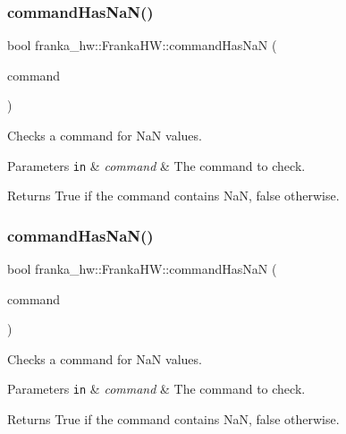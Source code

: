 \subsubsection{\texorpdfstring{command\+Has\+Na\+N()}{commandHasNaN()}\hspace{0.1cm}{\footnotesize\ttfamily [4/5]}}
{\footnotesize\ttfamily bool franka\+\_\+hw\+::\+Franka\+H\+W\+::command\+Has\+NaN (\begin{DoxyParamCaption}\item[{const franka\+::\+Cartesian\+Pose \&}]{command }\end{DoxyParamCaption})\hspace{0.3cm}{\ttfamily [static]}}

Checks a command for NaN values.


\begin{DoxyParams}[1]{Parameters}
\mbox{\tt in}  & {\em command} & The command to check.\\
\hline
\end{DoxyParams}
\begin{DoxyReturn}{Returns}
True if the command contains NaN, false otherwise. 
\end{DoxyReturn}
\mbox{\label{classfranka__hw_1_1_franka_h_w_ac408df87375bb8cfde94f4e5bf4a16c2}} 
\subsubsection{\texorpdfstring{command\+Has\+Na\+N()}{commandHasNaN()}\hspace{0.1cm}{\footnotesize\ttfamily [5/5]}}
{\footnotesize\ttfamily bool franka\+\_\+hw\+::\+Franka\+H\+W\+::command\+Has\+NaN (\begin{DoxyParamCaption}\item[{const franka\+::\+Cartesian\+Velocities \&}]{command }\end{DoxyParamCaption})\hspace{0.3cm}{\ttfamily [static]}}

Checks a command for NaN values.


\begin{DoxyParams}[1]{Parameters}
\mbox{\tt in}  & {\em command} & The command to check.\\
\hline
\end{DoxyParams}
\begin{DoxyReturn}{Returns}
True if the command contains NaN, false otherwise. 
\end{DoxyReturn}
\mbox{\label{classfranka__hw_1_1_franka_h_w_abbafdee04c749eae1726dd6e76f52c0f}} 
